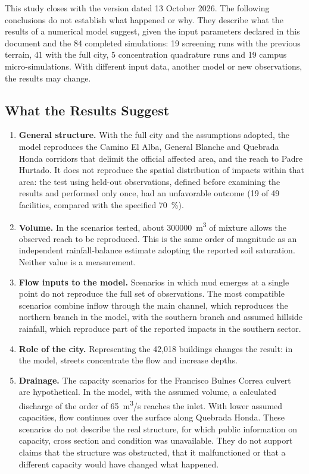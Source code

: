 This study closes with the version dated 13 October 2026. The following conclusions do not establish what happened or why. They describe what the results of a numerical model suggest, given the input parameters declared in this document and the 84 completed simulations: 19 screening runs with the previous terrain, 41 with the full city, 5 concentration quadrature runs and 19 campus micro-simulations. With different input data, another model or new observations, the results may change.

\subsection*{What the Results Suggest}
\begin{enumerate}
\item \textbf{General structure.} With the full city and the assumptions adopted, the model reproduces the Camino El Alba, General Blanche and Quebrada Honda corridors that delimit the official affected area, and the reach to Padre Hurtado. It does not reproduce the spatial distribution of impacts within that area: the test using held-out observations, defined before examining the results and performed only once, had an unfavorable outcome (19 of 49 facilities, compared with the specified \SI{70}{\percent}).
\item \textbf{Volume.} In the scenarios tested, about \SI{300000}{m^3} of mixture allows the observed reach to be reproduced. This is the same order of magnitude as an independent rainfall-balance estimate adopting the reported soil saturation. Neither value is a measurement.
\item \textbf{Flow inputs to the model.} Scenarios in which mud emerges at a single point do not reproduce the full set of observations. The most compatible scenarios combine inflow through the main channel, which reproduces the northern branch in the model, with the southern branch and assumed hillside rainfall, which reproduce part of the reported impacts in the southern sector.
\item \textbf{Role of the city.} Representing the 42,018 buildings changes the result: in the model, streets concentrate the flow and increase depths.
\item \textbf{Drainage.} The capacity scenarios for the Francisco Bulnes Correa culvert are hypothetical. In the model, with the assumed volume, a calculated discharge of the order of \SI{65}{m^3/s} reaches the inlet. With lower assumed capacities, flow continues over the surface along Quebrada Honda. These scenarios do not describe the real structure, for which public information on capacity, cross section and condition was unavailable. They do not support claims that the structure was obstructed, that it malfunctioned or that a different capacity would have changed what happened.

\end{enumerate}
